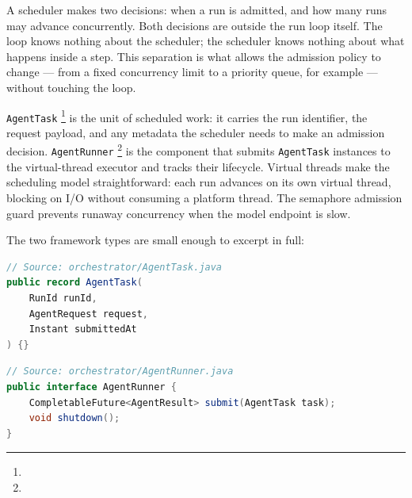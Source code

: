 A scheduler makes two decisions: when a run is admitted, and how many runs may
advance concurrently.
Both decisions are outside the run loop itself.
The loop knows nothing about the scheduler; the scheduler knows nothing about what
happens inside a step.
This separation is what allows the admission policy to change — from a fixed
concurrency limit to a priority queue, for example — without touching the loop.

\texttt{AgentTask}%
\footnote{}
is the unit of scheduled work: it carries the run identifier, the request payload,
and any metadata the scheduler needs to make an admission decision.
\texttt{AgentRunner}%
\footnote{}
is the component that submits \texttt{AgentTask} instances to the virtual-thread
executor and tracks their lifecycle.
Virtual threads make the scheduling model straightforward: each run advances on its
own virtual thread, blocking on I/O without consuming a platform thread.
The semaphore admission guard prevents runaway concurrency when the model endpoint
is slow.

The two framework types are small enough to excerpt in full:

\begin{lstlisting}[language=Java,caption={\texttt{AgentTask} --- \texttt{orchestrator/AgentTask.java}},label={lst:agent-task}]
// Source: orchestrator/AgentTask.java
public record AgentTask(
    RunId runId,
    AgentRequest request,
    Instant submittedAt
) {}
\end{lstlisting}

\begin{lstlisting}[language=Java,caption={\texttt{AgentRunner} interface --- \texttt{orchestrator/AgentRunner.java}},label={lst:agent-runner}]
// Source: orchestrator/AgentRunner.java
public interface AgentRunner {
    CompletableFuture<AgentResult> submit(AgentTask task);
    void shutdown();
}
\end{lstlisting}

